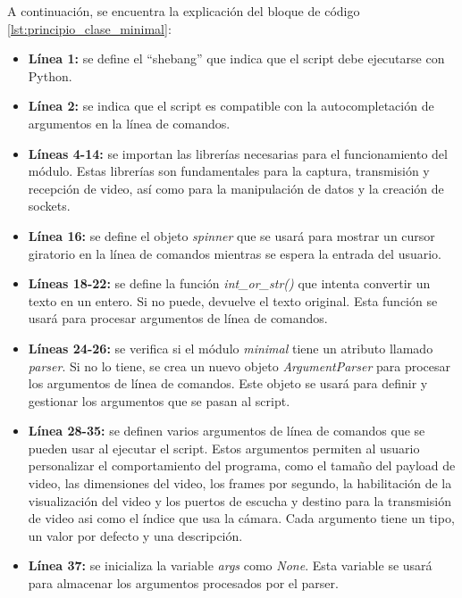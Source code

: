 A continuación, se encuentra la explicación del bloque de código \ref{lst:principio_clase_minimal}:

\begin{itemize}
    \item \textbf{Línea 1:} se define el ``shebang'' que indica que el script debe ejecutarse con Python.
    \item \textbf{Línea 2:} se indica que el script es compatible con la autocompletación de argumentos en la línea de comandos.
    \item \textbf{Líneas 4-14:} se importan las librerías necesarias para el funcionamiento del módulo. Estas librerías son fundamentales para la captura, transmisión y recepción de video, así como para la manipulación de datos y la creación de sockets.
    \item \textbf{Línea 16:} se define el objeto \textit{spinner} que se usará para mostrar un cursor giratorio en la línea de comandos mientras se espera la entrada del usuario.
    \item \textbf{Líneas 18-22:} se define la función \textit{int\_or\_str()} que intenta convertir un texto en un entero. Si no puede, devuelve el texto original. Esta función se usará para procesar argumentos de línea de comandos.
    \item \textbf{Líneas 24-26:} se verifica si el módulo \textit{minimal} tiene un atributo llamado \textit{parser}. Si no lo tiene, se crea un nuevo objeto \textit{ArgumentParser} para procesar los argumentos de línea de comandos. Este objeto se usará para definir y gestionar los argumentos que se pasan al script.
    \item \textbf{Línea 28-35:} se definen varios argumentos de línea de comandos que se pueden usar al ejecutar el script. Estos argumentos permiten al usuario personalizar el comportamiento del programa, como el tamaño del payload de video, las dimensiones del video, los frames por segundo, la habilitación de la visualización del video y los puertos de escucha y destino para la transmisión de video asi como el índice que usa la cámara. Cada argumento tiene un tipo, un valor por defecto y una descripción.
    \item \textbf{Línea 37:} se inicializa la variable \textit{args} como \textit{None}. Esta variable se usará para almacenar los argumentos procesados por el parser.
\end{itemize}

\vspace{\baselineskip}

